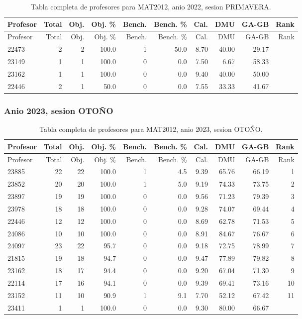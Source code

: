 \begingroup
\scriptsize
\setlength{\tabcolsep}{3pt}
\begin{longtable}{lrrrrrrrrr}
\caption{Tabla completa de profesores para MAT2012, anio 2022, sesion PRIMAVERA.}\label{tab:prof-period-mat2012-2022-primavera}\\
\toprule
Profesor & Total & Obj. & Obj. \% & Bench. & Bench. \% & Cal. & DMU & GA-GB & Rank \\
\midrule
\endfirsthead
\toprule
Profesor & Total & Obj. & Obj. \% & Bench. & Bench. \% & Cal. & DMU & GA-GB & Rank \\
\midrule
\endhead
22473 & 2 & 2 & 100.0 & 1 & 50.0 & 8.70 & 40.00 & 29.17 &  \\
23149 & 1 & 1 & 100.0 & 0 & 0.0 & 7.50 & 6.67 & 58.33 &  \\
23162 & 1 & 1 & 100.0 & 0 & 0.0 & 9.40 & 40.00 & 50.00 &  \\
22446 & 2 & 1 & 50.0 & 0 & 0.0 & 7.55 & 33.33 & 41.67 &  \\
\bottomrule
\end{longtable}
\endgroup

\subsubsection{Anio 2023, sesion OTOÑO}

\begingroup
\scriptsize
\setlength{\tabcolsep}{3pt}
\begin{longtable}{lrrrrrrrrr}
\caption{Tabla completa de profesores para MAT2012, anio 2023, sesion OTOÑO.}\label{tab:prof-period-mat2012-2023-oto-o}\\
\toprule
Profesor & Total & Obj. & Obj. \% & Bench. & Bench. \% & Cal. & DMU & GA-GB & Rank \\
\midrule
\endfirsthead
\toprule
Profesor & Total & Obj. & Obj. \% & Bench. & Bench. \% & Cal. & DMU & GA-GB & Rank \\
\midrule
\endhead
23885 & 22 & 22 & 100.0 & 1 & 4.5 & 9.39 & 65.76 & 66.19 & 1 \\
23852 & 20 & 20 & 100.0 & 1 & 5.0 & 9.19 & 74.33 & 73.75 & 2 \\
23897 & 19 & 19 & 100.0 & 0 & 0.0 & 9.56 & 71.23 & 79.39 & 3 \\
23978 & 18 & 18 & 100.0 & 0 & 0.0 & 9.28 & 74.07 & 69.44 & 4 \\
22446 & 12 & 12 & 100.0 & 0 & 0.0 & 8.69 & 62.78 & 71.53 & 5 \\
24086 & 10 & 10 & 100.0 & 0 & 0.0 & 8.91 & 84.67 & 76.67 & 6 \\
24097 & 23 & 22 & 95.7 & 0 & 0.0 & 9.18 & 72.75 & 78.99 & 7 \\
21815 & 19 & 18 & 94.7 & 0 & 0.0 & 9.47 & 77.89 & 79.82 & 8 \\
23162 & 18 & 17 & 94.4 & 0 & 0.0 & 9.20 & 67.04 & 71.30 & 9 \\
22114 & 17 & 16 & 94.1 & 0 & 0.0 & 9.39 & 69.41 & 73.16 & 10 \\
23152 & 11 & 10 & 90.9 & 1 & 9.1 & 7.70 & 52.12 & 67.42 & 11 \\
23411 & 1 & 1 & 100.0 & 0 & 0.0 & 9.30 & 80.00 & 66.67 &  \\
\bottomrule
\end{longtable}
\endgroup

